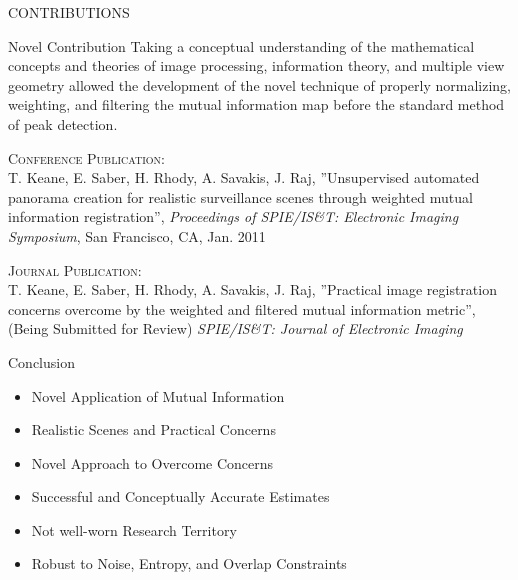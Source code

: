 \documentclass[serif]{beamer}
\begin{document}
\begin{frame}{\sc CONTRIBUTIONS}

\begin{block}{Novel Contribution}
Taking a conceptual understanding of the mathematical concepts and theories of image processing, information theory, and multiple view geometry allowed the development of the novel technique of properly normalizing, weighting, and filtering the mutual information map before the standard method of peak detection.
\end{block}


\vfill

\textsc{Conference Publication:}
\\
{\tiny T. Keane, E. Saber, H. Rhody, A. Savakis, J. Raj, ''Unsupervised automated panorama creation for realistic surveillance scenes through weighted mutual information registration'', \textit{Proceedings of SPIE/IS\&T: Electronic Imaging Symposium}, San Francisco, CA, Jan. 2011}

\vfill

\textsc{Journal Publication:}
\\
{\tiny T. Keane, E. Saber, H. Rhody, A. Savakis, J. Raj, ''Practical image registration concerns overcome by the weighted and filtered mutual information metric'', (Being Submitted for Review) \textit{SPIE/IS\&T: Journal of Electronic Imaging} }
\end{frame}



\begin{frame}[c]{\sc Conclusion}
\begin{itemize}
\item Novel Application of Mutual Information
\vfill
\item Realistic Scenes and Practical Concerns
\vfill
\item Novel Approach to Overcome Concerns
\vfill
\item Successful and Conceptually Accurate Estimates
\vfill
\item Not well-worn Research Territory
\vfill
\item Robust to Noise, Entropy, and Overlap Constraints
\vfill
\end{itemize}
\end{frame}


\end{document}
